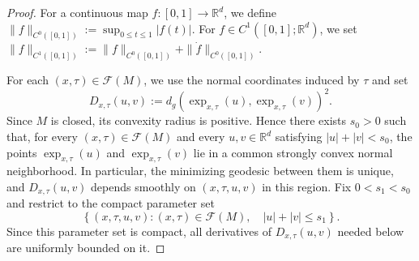 \documentclass[11pt]{article}
\theoremstyle{remark}
\numberwithin{equation}{section}
\begin{document}
\begin{proof}
For a continuous map $f:[0,1]\to\mathbb R^d$, we define
$\|f\|_{C^0([0,1])}
:=
\sup_{0\le t\le1}|f(t)|$.
For $f\in C^1([0,1];\mathbb R^d)$, we set
$\|f\|_{C^1([0,1])}
:=
\|f\|_{C^0([0,1])}
+
\|\dot f\|_{C^0([0,1])}$.


For each $(x,\tau)\in\mathcal F(M)$, we use the normal coordinates induced
by $\tau$ and set
\[
D_{x,\tau}(u,v)
:=
d_g\!\left(
\exp_{x,\tau}(u),
\exp_{x,\tau}(v)
\right)^2.
\]
Since $M$ is closed, its convexity radius is positive.  Hence there exists
$s_0>0$ such that, for every $(x,\tau)\in\mathcal F(M)$ and every
$u,v\in\mathbb R^d$ satisfying $|u|+|v|<s_0$,
the points $\exp_{x,\tau}(u)$ and $\exp_{x,\tau}(v)$ lie in a common
strongly convex normal neighborhood.  In particular, the minimizing
geodesic between them is unique, and $D_{x,\tau}(u,v)$ depends smoothly
on $(x,\tau,u,v)$ in this region.
Fix $0<s_1<s_0$ and restrict to the compact parameter set
\[
\left\{
(x,\tau,u,v):
(x,\tau)\in\mathcal F(M),\quad
|u|+|v|\le s_1
\right\}.
\]
Since this parameter set is compact, all derivatives of
$D_{x,\tau}(u,v)$ needed below are uniformly bounded on it.



\end{proof}
\end{document}
